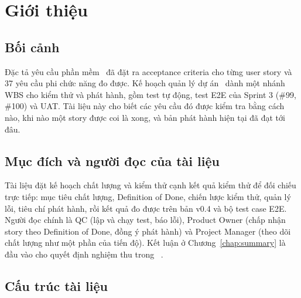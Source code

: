 \documentclass[12pt,a4paper]{report}
\begin{document}
\cleardoublepage{}
{}
\listoffigures

\cleardoublepage{}
{}
\listoftables

\chapter{Giới thiệu}
\label{chap:intro}

\section{Bối cảnh}

Đặc tả yêu cầu phần mềm~\cite{srs} đã đặt ra acceptance criteria cho từng user story và 37 yêu cầu phi chức năng
đo được. Kế hoạch quản lý dự án~\cite{pmp} dành một nhánh WBS cho kiểm thử và phát hành, gồm test tự động, test
E2E của Sprint 3 (\#99, \#100) và UAT. Tài liệu này cho biết các yêu cầu đó được kiểm tra bằng cách nào, khi nào
một story được coi là xong, và bản phát hành hiện tại đã đạt tới đâu.

\section{Mục đích và người đọc của tài liệu}

Tài liệu đặt kế hoạch chất lượng và kiểm thử cạnh kết quả kiểm thử để đối chiếu trực tiếp: mục tiêu chất lượng,
Definition of Done, chiến lược kiểm thử, quản lý lỗi, tiêu chí phát hành, rồi kết quả đo được trên bản v0.4 và bộ
test case E2E. Người đọc chính là QC (lập và chạy test, báo lỗi), Product Owner (chấp nhận story theo Definition of
Done, đồng ý phát hành) và Project Manager (theo dõi chất lượng như một phần của tiến độ). Kết luận ở
Chương~\ref{chap:summary} là đầu vào cho quyết định nghiệm thu trong ~\cite{pcr}.

\section{Cấu trúc tài liệu}
\end{document}
